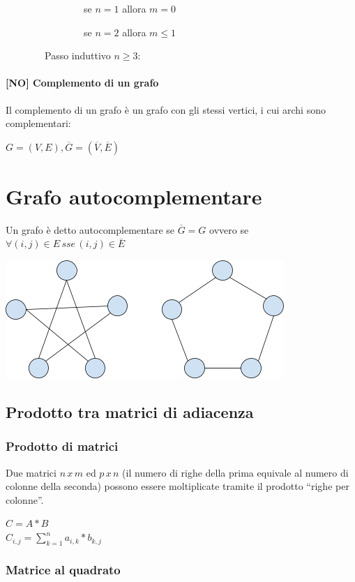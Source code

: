 {~~~~~~~~~~~~~~~~se $n=1$ allora $m = 0$

{~~~~~~~~~~~~~~~~se $n=2$ allora $m \leq 1$

{~~~~~~~~Passo induttivo $n \geq 3$:}


\paragraph{{[}NO{]} Complemento di un grafo}

{Il complemento di un grafo è un grafo con gli stessi vertici, i cui archi sono complementari:}

$G=(V,E), \overline{G}=(\overline{V},\overline{E})$

\section{Grafo autocomplementare}

{Un grafo è detto autocomplementare se $\overline{G}=G$ ovvero se $\forall(i,j) \in E\,sse\,(i,j) \in \overline{E}$}

{\includegraphics{images/image532.png}}

\subsection{Prodotto tra matrici di adiacenza}

\subsubsection{Prodotto di matrici}

{Due matrici $n\,x\,m$ ed $p\,x\,n$ (il numero di righe della prima equivale al numero di colonne della seconda) possono essere moltiplicate tramite il prodotto ``righe per colonne''.}

$C = A*B$ \\
$C_{i,j}=\sum_{k=1}^{n}{a_{i,k}*b_{k,j}}$

\subsubsection{Matrice al quadrato}


}}

